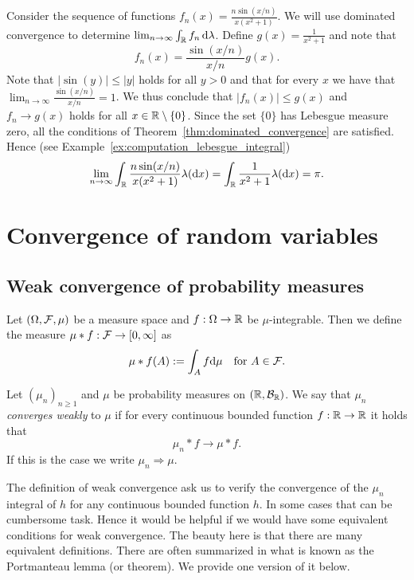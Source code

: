 \begin{example}
Consider the sequence of functions $f_n(x) = \frac{n \sin(x/n)}{x(x^2+1)}$. We will use dominated convergence to determine $\lim_{n \to \infty} \int_{\mathbb R} f_n \, \mathrm{d} \lambda$. Define $g(x) = \frac{1}{x^2 +1}$ and note that 
\[
	f_n(x) = \frac{\sin(x/n)}{x/n} g(x).
\]
Note that $|\sin(y)| \le |y|$ holds for all $y > 0$ and that for every $x$ we have that $\lim_{n \to \infty} \frac{\sin(x/n)}{x/n} = 1$. We thus conclude that $|f_n(x)| \le g(x)$ and $f_n \to g(x)$ holds for all $x \in \mathbb R \setminus \{0\}$. Since the set $\{0\}$ has Lebesgue measure zero, all the conditions of Theorem~\ref{thm:dominated_convergence} are satisfied. Hence (see Example~\ref{ex:computation_lebesgue_integral})
\[
	\lim_{n \to \infty} \int_{\mathbb R} \frac{n \sin(x/n)}{x(x^2+1)} \lambda(\mathrm{d} x) 
	= \int_{\mathbb R} \frac{1}{x^2 +1} \lambda(\mathrm{d} x) = \pi.
\]
\end{example}

\section{Convergence of random variables}

\subsection{Weak convergence of probability measures}

Let $(\Omega, \mathcal F, \mu)$ be a measure space and $f : \Omega \to \mathbb R$ be $\mu$-integrable. Then we define the measure $\mu \ast f : \mathcal F \to [0,\infty]$ as
\begin{equation}
	\mu \ast f (A) := \int_A f \mathrm{d} \mu \quad \text{for } A \in \mathcal F.
\end{equation}

\begin{definition}
Let $(\mu_n)_{n \ge 1}$ and $\mu$ be probability measures on $(\mathbb R, \mathcal B_{\mathbb R})$. We say that $\mu_n$ \emph{converges weakly} to $\mu$ if for every continuous bounded function $f : \mathbb R \to \mathbb R$ it holds that
\[
	\mu_n \ast f \to \mu \ast f.
\]
If this is the case we write $\mu_n \Rightarrow \mu$.
\end{definition}

The definition of weak convergence ask us to verify the convergence of the $\mu_n$ integral of $h$ for any continuous bounded function $h$. In some cases that can be cumbersome task. Hence it would be helpful if we would have some equivalent conditions for weak convergence. The beauty here is that there are many equivalent definitions. There are often summarized in what is known as the Portmanteau lemma (or theorem). We provide one version of it below.

